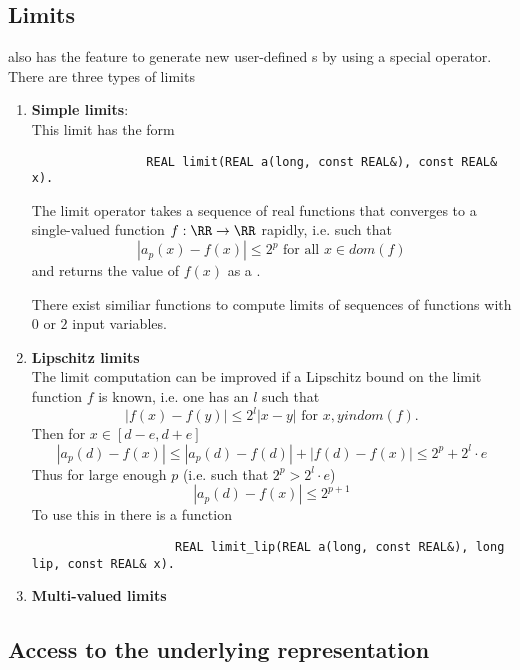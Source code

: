 	\subsection{Limits}
		\irram also has the feature to generate new user-defined {\real}s by using a special  operator.
		There are three types of limits
		\begin{enumerate}
			\item \textbf{Simple limits}: \\
			This limit has the form
			\begin{verbatim}
				REAL limit(REAL a(long, const REAL&), const REAL& x).
			\end{verbatim}

			The limit operator takes a sequence of real functions that converges to a single-valued function $f: \RR \to \RR$
			rapidly, i.e. such that 
			$$|a_p(x) - f(x)| \leq 2^p \text{ for all } x \in dom(f)$$
			and returns the value of $f(x)$ as a \real.

			There exist similiar functions to compute limits of sequences of functions with $0$ or $2$ input variables.
			\item \textbf{Lipschitz limits} \\
				The limit computation can be improved if a Lipschitz bound on the limit function $f$ is known, i.e. one has an $l$
				such that
				\begin{equation*}
					| f(x) - f(y) | \leq 2^l | x - y | \text{ for } x,y in dom(f).
				\end{equation*}
				Then for $x \in [d-e, d+e]$  
				$$ | a_p(d) - f(x) | \leq | a_p(d) - f(d) | + | f(d) - f(x) |  \leq 2^p + 2^l \cdot e $$
				Thus for large enough $p$ (i.e. such that $2^p > 2^l \cdot e$)
				$$ | a_p(d) - f(x) | \leq  2^{p+1} $$
				To use this in \irram there is a function
				\begin{verbatim}
					REAL limit_lip(REAL a(long, const REAL&), long lip, const REAL& x).
				\end{verbatim}
			\item \textbf{Multi-valued limits}
		\end{enumerate}
	\subsection{Access to the underlying representation}
		
